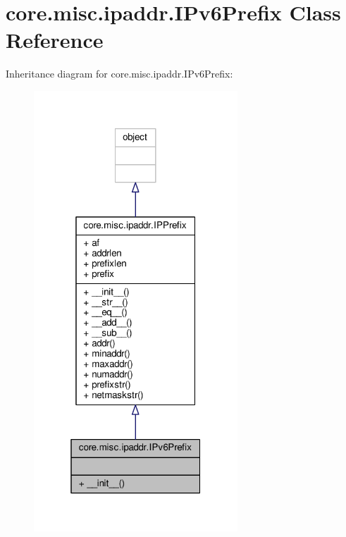\hypertarget{classcore_1_1misc_1_1ipaddr_1_1_i_pv6_prefix}{\section{core.\+misc.\+ipaddr.\+I\+Pv6\+Prefix Class Reference}
\label{classcore_1_1misc_1_1ipaddr_1_1_i_pv6_prefix}
}


Inheritance diagram for core.\+misc.\+ipaddr.\+I\+Pv6\+Prefix\+:
\nopagebreak
\begin{figure}[H]
\begin{center}
\leavevmode
\includegraphics[width=217pt]{classcore_1_1misc_1_1ipaddr_1_1_i_pv6_prefix__inherit__graph}
\end{center}
\end{figure}


